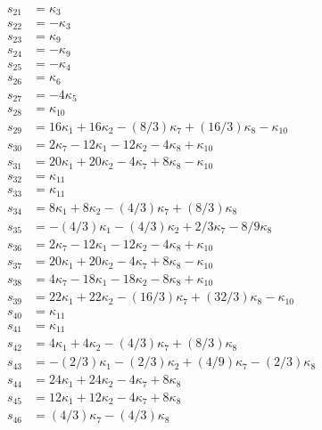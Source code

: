 \documentclass[11pt]{article}
\begin{document}
\begin{align}
s_{21} &= \kappa_3\\
s_{22} &= -\kappa_3\\
s_{23} &= \kappa_9\\
s_{24} &= -\kappa_9\\
s_{25} &= -\kappa_4\\
s_{26} &= \kappa_6\\
s_{27} &= - 4  \kappa_5\\
s_{28} &= \kappa_{10}\\
s_{29} 
&= 
16  \kappa_1 + 16  \kappa_2 - (8/3)  \kappa_7 + (16/3)  \kappa_8 - \kappa_{10}\\
s_{30} 
&= 2  \kappa_7 - 12  \kappa_1 - 12  \kappa_2 - 4  \kappa_8 + \kappa_{10}\\
s_{31} 
&= 20  \kappa_1 + 20  \kappa_2 - 4  \kappa_7 + 8  \kappa_8 - \kappa_{10}\\
s_{32} &= \kappa_11\\
s_{33} &= \kappa_11\\
s_{34} &= 8  \kappa_1 + 8  \kappa_2 - (4/3)  \kappa_7 + (8/3)  \kappa_8\\
s_{35} &= -(4/3)  \kappa_1 - (4/3)  \kappa_2 + 2/3  \kappa_7 - 8/9  \kappa_8\\
s_{36} 
&= 2  \kappa_7 - 12  \kappa_1 - 12  \kappa_2 - 4  \kappa_8 + \kappa_{10}\\
s_{37} 
&= 20  \kappa_1 + 20  \kappa_2 - 4  \kappa_7 + 8  \kappa_8 - \kappa_{10}\\
s_{38} 
&= 4  \kappa_7 - 18  \kappa_1 - 18  \kappa_2 - 8  \kappa_8 + \kappa_{10}\\
s_{39} 
&= 
22  \kappa_1 + 22  \kappa_2 - (16/3)  \kappa_7 
+ (32/3)  \kappa_8 - \kappa_{10}\\
s_{40} &= \kappa_{11}\\
s_{41} &= \kappa_{11}\\
s_{42} &= 4  \kappa_1 + 4  \kappa_2 - (4/3)  \kappa_7 + (8/3)  \kappa_8\\
s_{43} 
&= -(2/3)  \kappa_1 - (2/3)  \kappa_2 + (4/9)  \kappa_7 - (2/3)  \kappa_8\\
s_{44} &= 24  \kappa_1 + 24  \kappa_2 - 4  \kappa_7 + 8  \kappa_8\\
s_{45} &= 12  \kappa_1 + 12  \kappa_2 - 4  \kappa_7 + 8  \kappa_8\\
s_{46} &= (4/3)  \kappa_7 - (4/3)  \kappa_8
\end{align}
\end{document}
